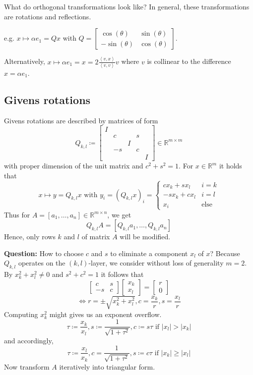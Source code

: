 \documentclass[a4paper]{article}
\numberwithin{lecref}{section}
\theoremstyle{break}
\newcommand{\Abs}[1]{\left|#1\right|}
\newcommand{\IP}[2]{\left\langle#1, #2\right\rangle}
\begin{document}
What do orthogonal transformations look like?
In general, these transformations are rotations and reflections.

e.g. $x \mapsto \alpha e_1 = Qx$ with $Q = \begin{bmatrix} \cos(\theta) & \sin(\theta) \\ -\sin(\theta) & \cos(\theta) \end{bmatrix}$.

Alternatively, $x \mapsto \alpha e_1 = x = 2\frac{\IP vx}{\IP vv} v$ where $v$ is collinear to the difference $x = \alpha e_1$.

\subsection*{Givens rotations}

Givens rotations are described by matrices of form
\[
  Q_{k,l} \coloneqq \begin{bmatrix}
    I &    &   &   & \\
      & c  &   & s & \\
      &    & I &   & \\
      & -s &   & c & \\
      &    &   &   & I
  \end{bmatrix}
  \in \mathbb R^{m \times m}
\]
with proper dimension of the unit matrix and $c^2 + s^2 = 1$. For $x \in \mathbb R^m$ it holds that
\[
  x \mapsto y = Q_{k,l} x \text{ with } y_i = (Q_{k,l} x)_i =
  \begin{cases}
    c x_k + sx_l & i = k \\
    -s x_k + cx_l & i = l \\
    x_i & \text{else}
  \end{cases}
\]
Thus for $A = [a_1, \dots, a_n] \in \mathbb R^{m \times n}$, we get
\[ Q_{k,l} A = [Q_{k,l} a_1, \dots, Q_{k,l} a_n] \]
Hence, only rows $k$ and $l$ of matrix $A$ will be modified.

\textbf{Question:} How to choose $c$ and $s$ to eliminate a component $x_l$ of $x$?
Because $Q_{k,l}$ operates on the $(k,l)$-layer, we consider without loss of generality $m=2$.
By $x_k^2 + x_l^2 \neq 0$ and $s^2 + c^2 = 1$ it follows that
\[ \begin{bmatrix} c & s \\ -s & c \end{bmatrix} \begin{bmatrix} x_k \\ x_l \end{bmatrix} = \begin{bmatrix} r \\ 0 \end{bmatrix} \]
\[ \iff r = \pm \sqrt{x_k^2 + x_l^2}, c = \frac{x_k}{r}, s = \frac{x_l}{r} \]
Computing $x_k^2$ might gives us an exponent overflow.
\[ \tau \coloneqq \frac{x_k}{x_l}, s \coloneqq \frac{1}{\sqrt{1 + \tau^2}}, c \coloneqq s\tau \text{ if } \Abs{x_l} > \Abs{x_k} \]
and accordingly,
\[ \tau \coloneqq \frac{x_l}{x_k}, c = \frac{1}{\sqrt{1 + \tau^2}}, s \coloneqq c\tau \text{ if } \Abs{x_k} \geq \Abs{x_l} \]
Now transform $A$ iteratively into triangular form.
\end{document}
